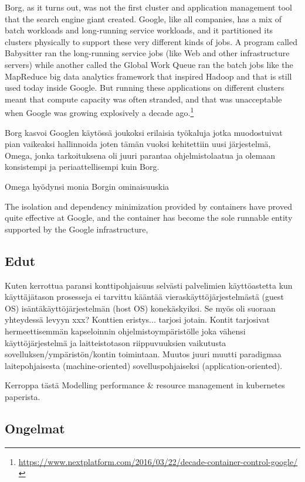 \documentclass[finnish]{tktltiki2}
\theoremstyle{definition}
\theoremstyle{remark}
\begin{document}
Borg, as it turns out, was not the first cluster and application management tool that the search engine giant created. Google, like all companies, has a mix of batch workloads and long-running service workloads, and it partitioned its clusters physically to support these very different kinds of jobs. A program called Babysitter ran the long-running service jobs (like Web and other infrastructure servers) while another called the Global Work Queue ran the batch jobs like the MapReduce big data analytics framework that inspired Hadoop and that is still used today inside Google. But running these applications on different clusters meant that compute capacity was often stranded, and that was unacceptable when Google was growing explosively a decade ago.\footnote{\url{https://www.nextplatform.com/2016/03/22/decade-container-control-google/}}

Borg kasvoi Googlen käytössä joukoksi erilaisia työkaluja jotka muodostuivat pian vaikeaksi hallinnoida joten tämän vuoksi kehitettiin uusi järjestelmä, Omega, jonka tarkoituksena oli juuri parantaa ohjelmistolaatua ja olemaan konsistempi ja periaattellisempi kuin Borg. \cite{borg-omega-kubernetes}

Omega hyödynsi monia Borgin ominaisuuskia

The isolation and dependency minimization provided by containers have proved quite effective at Google, and the container has become the sole runnable entity supported by the Google infrastructure,

\subsection{Edut}

Kuten kerrottua paransi konttipohjaisuus selvästi palvelimien käyttöastetta kun käyttäjätason prosesseja ei tarvittu kääntää vieraskäyttöjärjestelmästä (guest OS) isäntäkäyttöjärjestelmän (host OS) konekäskyiksi. Se myös oli suoraan yhteydessä levyyn xxx? Konttien eristys... tarjosi jotain. Kontit tarjosivat hermeettisemmän kapseloinnin ohjelmistoympäristölle joka vähensi käyttöjärjestelmä ja laitteistotason riippuvuuksien vaikutusta sovelluksen/ympäristön/kontin toimintaan. Muutos juuri muutti paradigmaa laitepohjaisesta (machine-oriented) sovelluspohjaiseksi (application-oriented).

Kerroppa tästä Modelling performance \& resource management in kubernetes paperista. \cite{kubernetes-performance}

\subsection{Ongelmat}
\end{document}
